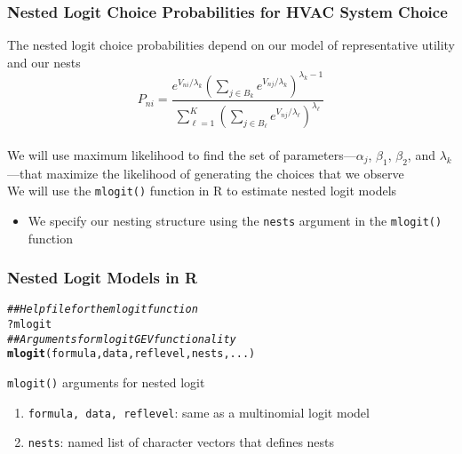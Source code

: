\documentclass{beamer}\usepackage[]{graphicx}\usepackage[]{xcolor}
\makeatletter
\newcommand{\hlcom}[1]{\textcolor[rgb]{0.678,0.584,0.686}{\textit{#1}}}%
\newcommand{\hlopt}[1]{\textcolor[rgb]{0,0,0}{#1}}%
\newcommand{\hlstd}[1]{\textcolor[rgb]{0.345,0.345,0.345}{#1}}%
\newcommand{\hlkwd}[1]{\textcolor[rgb]{0.737,0.353,0.396}{\textbf{#1}}}%
\newenvironment{kframe}{%
 \def\at@end@of@kframe{}%
 \ifinner\ifhmode%
  \def\at@end@of@kframe{\end{minipage}}%
  \begin{minipage}{\columnwidth}%
 \fi\fi%
 \def\FrameCommand##1{\hskip\@totalleftmargin \hskip-\fboxsep
 \colorbox{shadecolor}{##1}\hskip-\fboxsep
     \hskip-\linewidth \hskip-\@totalleftmargin \hskip\columnwidth}%
 \MakeFramed {\advance\hsize-\width
   \@totalleftmargin\z@ \linewidth\hsize
   \@setminipage}}%
 {\par\unskip\endMakeFramed%
 \at@end@of@kframe}
\newenvironment{knitrout}{}{} %
\makeatother
\begin{document}
\begin{frame}\frametitle{Nested Logit Choice Probabilities for HVAC System Choice}
    The nested logit choice probabilities depend on our model of representative utility and our nests
    $$P_{ni} = \frac{e^{V_{ni} / \lambda_k} \left( \sum_{j \in B_k} e^{V_{nj} / \lambda_k} \right)^{\lambda_k - 1}}{\sum_{\ell = 1}^K \left( \sum_{j \in B_{\ell}} e^{V_{nj} / \lambda_{\ell}} \right)^{\lambda_{\ell}}}$$ \\
    \vspace{2ex}
    We will use maximum likelihood to find the set of parameters---$\alpha_j$, $\beta_1$, $\beta_2$, and $\lambda_k$---that maximize the likelihood of generating the choices that we observe \\
    \vspace{2ex}
    We will use the \texttt{mlogit()} function in R to estimate nested logit models
	\begin{itemize}
		\item We specify our nesting structure using the \texttt{nests} argument in the \texttt{mlogit()} function
	\end{itemize}
\end{frame}

\begin{frame}[fragile]\frametitle{Nested Logit Models in R}
\begin{knitrout}\footnotesize
{}\color{fgcolor}\begin{kframe}
\begin{alltt}
\hlcom{## Help file for the mlogit function}
\hlopt{?}\hlstd{mlogit}
\hlcom{## Arguments for mlogit GEV functionality}
\hlkwd{mlogit}\hlstd{(formula, data, reflevel, nests, ...)}
\end{alltt}
\end{kframe}
\end{knitrout}
    \vspace{2ex}
    \texttt{mlogit()} arguments for nested logit
    \begin{enumerate}
        \item \texttt{formula, data, reflevel}: same as a multinomial logit model
        \item \texttt{nests}: named list of character vectors that defines nests
    \end{enumerate}
\end{frame}
\end{document}

